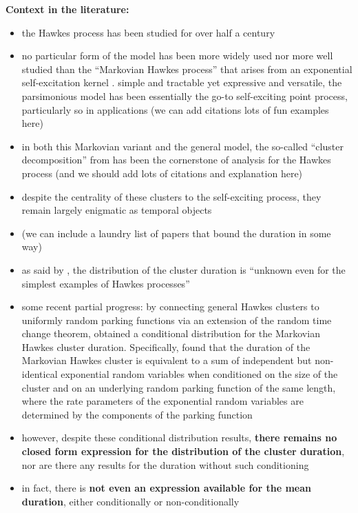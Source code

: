 \textbf{Context in the literature:}
\begin{itemize}
\item the Hawkes process has been studied for over half a century \citep{hawkes1971spectra}
\item no particular form of the model has been more widely used nor more well studied than the ``Markovian Hawkes process'' that arises from an exponential self-excitation kernel
\citep{oakes1975markovian}. simple and tractable yet expressive and versatile, the parsimonious model has been essentially the go-to self-exciting point process, particularly so in applications (we can add citations lots of fun examples here)
\item in both this Markovian variant and the general model, the so-called ``cluster decomposition'' from \citet{hawkes1974cluster} has been the cornerstone of analysis for the Hawkes process (and we should add lots of citations and explanation here)
\item despite the centrality of these clusters to the self-exciting process, they remain largely enigmatic as temporal objects
\item (we can include a laundry list of papers that bound the duration in some way)
\item as said by \citet{moller2005perfect}, the distribution of the cluster duration is ``unknown even for the simplest examples of Hawkes processes''
\item some recent partial progress:  by connecting general Hawkes clusters to uniformly random parking functions via an extension of the random time change theorem, \citet{daw2023conditional} obtained a conditional distribution  for the Markovian Hawkes cluster duration. Specifically, \citet{daw2023conditional} found that the duration of the Markovian Hawkes cluster is equivalent to a sum of independent but non-identical exponential random variables when conditioned on the size of the cluster and on an underlying random parking function of the same length, where the rate parameters of the exponential random variables are determined by the components of the parking function
\item however, despite these conditional distribution results, \textbf{there remains no closed form expression for the distribution of the cluster duration}, nor are there any results for the duration without such conditioning
\item in fact, there is \textbf{not even an expression available for the mean duration}, either conditionally or non-conditionally
\end{itemize}




